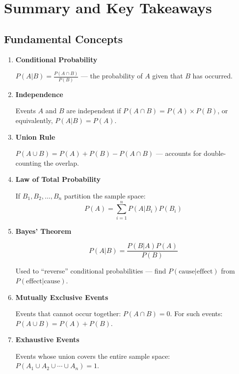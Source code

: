 \documentclass[11pt,a4paper]{article}
\begin{document}
\newpage
\section{Summary and Key Takeaways}

\subsection*{Fundamental Concepts}

\begin{enumerate}
    \item \textbf{Conditional Probability}
    
    $P(A|B) = \frac{P(A \cap B)}{P(B)}$ — the probability of $A$ given that $B$ has occurred.
    
    \item \textbf{Independence}
    
    Events $A$ and $B$ are independent if $P(A \cap B) = P(A) \times P(B)$, or equivalently, $P(A|B) = P(A)$.
    
    \item \textbf{Union Rule}
    
    $P(A \cup B) = P(A) + P(B) - P(A \cap B)$ — accounts for double-counting the overlap.
    
    \item \textbf{Law of Total Probability}
    
    If $B_1, B_2, \ldots, B_n$ partition the sample space:
    \[
    P(A) = \sum_{i=1}^{n} P(A|B_i) P(B_i)
    \]
    
    \item \textbf{Bayes' Theorem}
    
    \[
    P(A|B) = \frac{P(B|A) P(A)}{P(B)}
    \]
    
    Used to ``reverse'' conditional probabilities — find $P(\text{cause}|\text{effect})$ from $P(\text{effect}|\text{cause})$.
    
    \item \textbf{Mutually Exclusive Events}
    
    Events that cannot occur together: $P(A \cap B) = 0$. For such events: $P(A \cup B) = P(A) + P(B)$.
    
    \item \textbf{Exhaustive Events}
    
    Events whose union covers the entire sample space: $P(A_1 \cup A_2 \cup \cdots \cup A_n) = 1$.
\end{enumerate}
\end{document}
